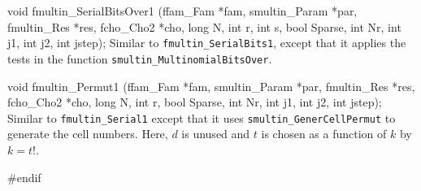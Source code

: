 void fmultin_SerialBitsOver1 (ffam_Fam *fam, smultin_Param *par,
                              fmultin_Res *res, fcho_Cho2 *cho,
                              long N, int r, int s, bool Sparse,
                              int Nr, int j1, int j2, int jstep);
\endcode
\tab
 Similar to {\tt fmultin\_SerialBits1}, except that it applies the
 tests in the function {\tt smultin\_Mul\-ti\-no\-mialBitsOver}.
\endtab
\code


void fmultin_Permut1 (ffam_Fam *fam, smultin_Param *par,
                      fmultin_Res *res, fcho_Cho2 *cho,
                      long N, int r, bool Sparse,
                      int Nr, int j1, int j2, int jstep);
\endcode
\tab
 Similar to {\tt fmultin\_Serial1} except that it uses
 {\tt smultin\_GenerCellPermut} to generate the cell numbers.
 Here, $d$ is unused and $t$ is chosen as a function of $k$ by $k=t!$.
\endtab

\code
\hide
#endif
\endhide
\endcode
